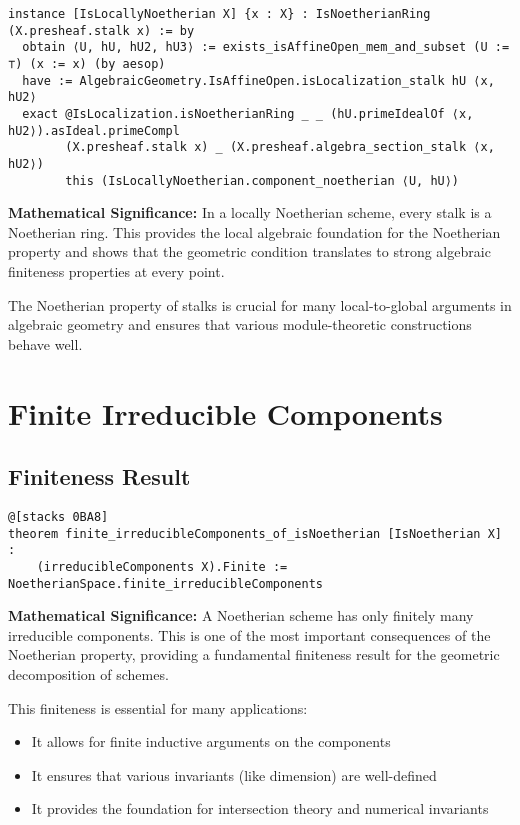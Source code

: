 \documentclass{article}
\theoremstyle{definition}
\begin{document}
\begin{lstlisting}
instance [IsLocallyNoetherian X] {x : X} : IsNoetherianRing (X.presheaf.stalk x) := by
  obtain ⟨U, hU, hU2, hU3⟩ := exists_isAffineOpen_mem_and_subset (U := ⊤) (x := x) (by aesop)
  have := AlgebraicGeometry.IsAffineOpen.isLocalization_stalk hU ⟨x, hU2⟩
  exact @IsLocalization.isNoetherianRing _ _ (hU.primeIdealOf ⟨x, hU2⟩).asIdeal.primeCompl
        (X.presheaf.stalk x) _ (X.presheaf.algebra_section_stalk ⟨x, hU2⟩)
        this (IsLocallyNoetherian.component_noetherian ⟨U, hU⟩)
\end{lstlisting}

\textbf{Mathematical Significance:} In a locally Noetherian scheme, every stalk is a Noetherian ring. This provides the local algebraic foundation for the Noetherian property and shows that the geometric condition translates to strong algebraic finiteness properties at every point.

The Noetherian property of stalks is crucial for many local-to-global arguments in algebraic geometry and ensures that various module-theoretic constructions behave well.

\section{Finite Irreducible Components}

\subsection{Finiteness Result}

\begin{lstlisting}
@[stacks 0BA8]
theorem finite_irreducibleComponents_of_isNoetherian [IsNoetherian X] :
    (irreducibleComponents X).Finite := NoetherianSpace.finite_irreducibleComponents
\end{lstlisting}

\textbf{Mathematical Significance:} A Noetherian scheme has only finitely many irreducible components. This is one of the most important consequences of the Noetherian property, providing a fundamental finiteness result for the geometric decomposition of schemes.

This finiteness is essential for many applications:
\begin{itemize}
\item It allows for finite inductive arguments on the components
\item It ensures that various invariants (like dimension) are well-defined
\item It provides the foundation for intersection theory and numerical invariants
\end{itemize}
\end{document}
